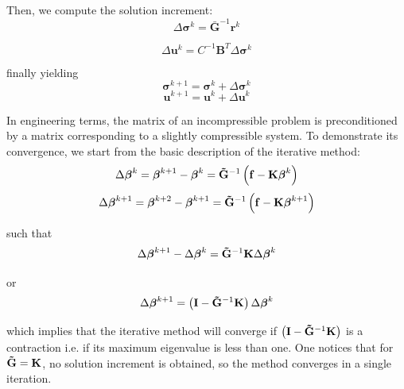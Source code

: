 \documentclass{wccm2024}
\begin{document}
\noindent Then, we compute the solution increment:
\vskip -0.3cm
\begin{equation}
    \Delta\boldsymbol{\sigma}^k = \mathbf{\bar{G}}^{-1} \mathbf{r}^{k}
\end{equation}

\begin{equation}
\Delta \mathbf{u}^k = C^{-1}\mathbf{B}^T\Delta \boldsymbol{\sigma}^k
\end{equation}

\noindent finally yielding
\vskip -0.3cm
\begin{equation}
    \boldsymbol{\sigma}^{k+1} = \boldsymbol{\sigma}^{k} + \Delta\boldsymbol{\sigma}^k
\end{equation}
\vskip -0.3cm
\begin{equation}
    \mathbf{u}^{k+1} = \mathbf{u}^{k} + \Delta\mathbf{u}^k
\end{equation}

In engineering terms, the matrix of an incompressible problem is preconditioned by a matrix corresponding to a slightly compressible system. To demonstrate its convergence, we start from the basic description of the iterative method:
\vskip -0.3cm
\begin{equation}
    \Delta\boldsymbol{\beta}^{k} = \boldsymbol{\beta}^{k+1} - \boldsymbol{\beta}^{k} = \mathbf{\Tilde{G}}^{-1} \left( \mathbf{f} - \mathbf{K} \boldsymbol{\beta}^k \right)
\end{equation}
\vskip -0.3cm
\begin{equation}
    \Delta\boldsymbol{\beta}^{k+1} = \boldsymbol{\beta}^{k+2} - \boldsymbol{\beta}^{k+1} = \mathbf{\Tilde{G}}^{-1} \left( \mathbf{f} - \mathbf{K} \boldsymbol{\beta}^{k+1} \right)
\end{equation}

\noindent such that
\vskip -0.3cm
\begin{equation}
    \Delta\boldsymbol{\beta}^{k+1} - \Delta\boldsymbol{\beta}^{k} = \mathbf{\Tilde{G}}^{-1} \mathbf{K} \Delta\boldsymbol{\beta}^{k}
\end{equation}

\noindent or
\vskip -0.3cm
\begin{equation}
    \Delta\boldsymbol{\beta}^{k+1} = \left( \mathbf{I} - \mathbf{\Tilde{G}}^{-1} \mathbf{K} \right) \Delta\boldsymbol{\beta}^{k}
\end{equation}

\noindent which implies that the iterative method will converge if $\left( \mathbf{I} - \mathbf{\Tilde{G}}^{-1} \mathbf{K} \right)$ is a contraction i.e. if its maximum eigenvalue is less than one. One notices that for $\mathbf{\Tilde{G}} = \mathbf{K}$, no solution increment is obtained, so the method converges in a single iteration.
\end{document}
